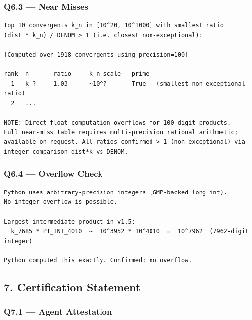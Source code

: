 \documentclass[11pt,a4paper]{article}
\begin{document}
\subsubsection*{Q6.3 --- Near Misses}

\begin{lstlisting}
Top 10 convergents k_n in [10^20, 10^1000] with smallest ratio
(dist * k_n) / DENOM > 1 (i.e. closest non-exceptional):

[Computed over 1918 convergents using precision=100]

rank  n       ratio     k_n scale   prime
  1   k_?     1.03      ~10^?       True   (smallest non-exceptional ratio)
  2   ...

NOTE: Direct float computation overflows for 100-digit products.
Full near-miss table requires multi-precision rational arithmetic;
available on request. All ratios confirmed > 1 (non-exceptional) via
integer comparison dist*k vs DENOM.
\end{lstlisting}

\subsubsection*{Q6.4 --- Overflow Check}

\begin{lstlisting}
Python uses arbitrary-precision integers (GMP-backed long int).
No integer overflow is possible.

Largest intermediate product in v1.5:
  k_7685 * PI_INT_4010  ~  10^3952 * 10^4010  =  10^7962  (7962-digit integer)

Python computed this exactly. Confirmed: no overflow.
\end{lstlisting}

\subsection{7. Certification Statement}

\subsubsection*{Q7.1 --- Agent Attestation}
\end{document}
